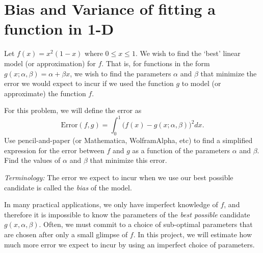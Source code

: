 \section{Bias and Variance of fitting a function in 1-D}

Let $f(x) = x^2(1-x)$ where $0 \leq x \leq 1$. We wish to find the `best' linear model (or approximation) for $f$. That is, for functions in the form $g(x; \alpha, \beta) =  \alpha +  \beta x$,  we wish to find the parameters $ \alpha$ and $ \beta$ that minimize the error we would expect to incur if we used the function $g$ to model (or approximate) the function $f$. 
\begin{center}
\end{center}
For this problem, we will define the error as
\begin{equation*}
\text{Error}(f,g) = \int_0^1 \bigg(f(x) - g(x; \alpha, \beta)\bigg)^2 dx.
\end{equation*} 
Use pencil-and-paper (or Mathematica, WolframAlpha, etc) to find a simplified expression for the error between $f$ and $g$ as a function of the parameters $ \alpha$ and $ \beta$. Find the values of $ \alpha$ and $ \beta$ that minimize this error.

\textit{Terminology:} The error we expect to incur when we use our best possible candidate is called the \textit{bias} of the model.


In many practical applications, we only have imperfect knowledge of $f$, and therefore it is impossible to know the parameters of the \textit{best possible} candidate $g(x, \alpha, \beta)$. Often, we must commit to a choice of sub-optimal parameters that are chosen after only a small glimpse of $f$. In this project, we will estimate how much more error we expect to incur by using an imperfect choice of parameters.


